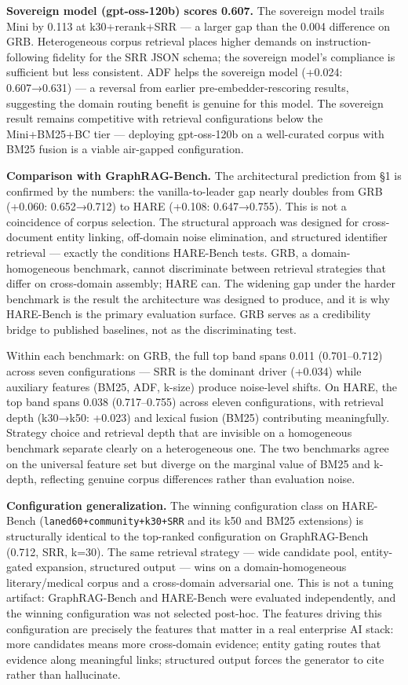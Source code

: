\documentclass[
]{article}
\begin{document}
\textbf{Sovereign model (gpt-oss-120b) scores 0.607.} The sovereign
model trails Mini by 0.113 at k30+rerank+SRR --- a larger gap than the
0.004 difference on GRB. Heterogeneous corpus retrieval places higher
demands on instruction-following fidelity for the SRR JSON schema; the
sovereign model's compliance is sufficient but less consistent. ADF
helps the sovereign model (+0.024: 0.607→0.631) --- a reversal from
earlier pre-embedder-rescoring results, suggesting the domain routing
benefit is genuine for this model. The sovereign result remains
competitive with retrieval configurations below the Mini+BM25+BC tier
--- deploying gpt-oss-120b on a well-curated corpus with BM25 fusion is
a viable air-gapped configuration.

\textbf{Comparison with GraphRAG-Bench.} The architectural prediction
from §1 is confirmed by the numbers: the vanilla-to-leader gap nearly
doubles from GRB (+0.060: 0.652→0.712) to HARE (+0.108: 0.647→0.755).
This is not a coincidence of corpus selection. The structural approach
was designed for cross-document entity linking, off-domain noise
elimination, and structured identifier retrieval --- exactly the
conditions HARE-Bench tests. GRB, a domain-homogeneous benchmark, cannot
discriminate between retrieval strategies that differ on cross-domain
assembly; HARE can. The widening gap under the harder benchmark is the
result the architecture was designed to produce, and it is why
HARE-Bench is the primary evaluation surface. GRB serves as a
credibility bridge to published baselines, not as the discriminating
test.

Within each benchmark: on GRB, the full top band spans 0.011
(0.701--0.712) across seven configurations --- SRR is the dominant
driver (+0.034) while auxiliary features (BM25, ADF, k-size) produce
noise-level shifts. On HARE, the top band spans 0.038 (0.717--0.755)
across eleven configurations, with retrieval depth (k30→k50: +0.023) and
lexical fusion (BM25) contributing meaningfully. Strategy choice and
retrieval depth that are invisible on a homogeneous benchmark separate
clearly on a heterogeneous one. The two benchmarks agree on the
universal feature set but diverge on the marginal value of BM25 and
k-depth, reflecting genuine corpus differences rather than evaluation
noise.

\textbf{Configuration generalization.} The winning configuration class
on HARE-Bench (\texttt{laned60+community+k30+SRR} and its k50 and BM25
extensions) is structurally identical to the top-ranked configuration on
GraphRAG-Bench (0.712, SRR, k=30). The same retrieval strategy --- wide
candidate pool, entity-gated expansion, structured output --- wins on a
domain-homogeneous literary/medical corpus and a cross-domain
adversarial one. This is not a tuning artifact: GraphRAG-Bench and
HARE-Bench were evaluated independently, and the winning configuration
was not selected post-hoc. The features driving this configuration are
precisely the features that matter in a real enterprise AI stack: more
candidates means more cross-domain evidence; entity gating routes that
evidence along meaningful links; structured output forces the generator
to cite rather than hallucinate.
\end{document}
